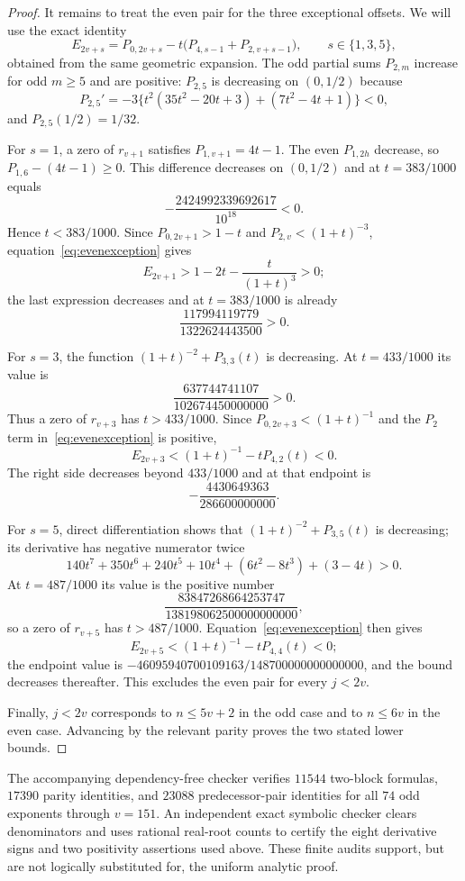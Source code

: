\documentclass[11pt]{article}
\theoremstyle{remark}
\numberwithin{equation}{section}
\begin{document}
\begin{proof}
It remains to treat the even pair for the three exceptional offsets.  We
will use the exact identity
\begin{equation}\label{eq:evenexception}
 E_{2v+s}=P_{0,2v+s}
 -t\bigl(P_{4,s-1}+P_{2,v+s-1}\bigr),
 \qquad s\in\{1,3,5\},
\end{equation}
obtained from the same geometric expansion.  The odd partial sums
$P_{2,m}$ increase for odd $m\ge5$ and are positive: $P_{2,5}$ is decreasing
on $(0,1/2)$ because
\[
 P_{2,5}'=-3\{t^2(35t^2-20t+3)+(7t^2-4t+1)\}<0,
\]
and $P_{2,5}(1/2)=1/32$.

For $s=1$, a zero of $r_{v+1}$ satisfies
$P_{1,v+1}=4t-1$.  The even $P_{1,2h}$ decrease, so
$P_{1,6}-(4t-1)\ge0$.  This difference decreases on $(0,1/2)$ and at
$t=383/1000$ equals
\[
 -\frac{2424992339692617}{10^{18}}<0.
\]
Hence $t<383/1000$.  Since $P_{0,2v+1}>1-t$ and
$P_{2,v}<(1+t)^{-3}$, equation~\eqref{eq:evenexception} gives
\[
 E_{2v+1}>1-2t-\frac{t}{(1+t)^3}>0;
\]
the last expression decreases and at $t=383/1000$ is already
\[
 \frac{117994119779}{1322624443500}>0.
\]

For $s=3$, the function $(1+t)^{-2}+P_{3,3}(t)$ is decreasing.  At
$t=433/1000$ its value is
\[
 \frac{637744741107}{102674450000000}>0.
\]
Thus a zero of $r_{v+3}$ has $t>433/1000$.  Since
$P_{0,2v+3}<(1+t)^{-1}$ and the
$P_2$ term in~\eqref{eq:evenexception} is positive,
\[
 E_{2v+3}<(1+t)^{-1}-tP_{4,2}(t)<0.
\]
The right side decreases beyond $433/1000$ and at that endpoint is
\[
 -\frac{4430649363}{286600000000}.
\]

For $s=5$, direct differentiation shows that
$(1+t)^{-2}+P_{3,5}(t)$ is decreasing; its derivative has negative
numerator twice
\[
 140t^7+350t^6+240t^5+10t^4+(6t^2-8t^3)+(3-4t)>0.
\]
At $t=487/1000$ its value is the positive number
\[
 \frac{83847268664253747}{138198062500000000000},
\]
so a zero of $r_{v+5}$ has $t>487/1000$.
Equation~\eqref{eq:evenexception} then gives
\[
 E_{2v+5}<(1+t)^{-1}-tP_{4,4}(t)<0;
\]
the endpoint value is
$-46095940700109163/148700000000000000$, and the bound decreases thereafter.
This excludes the even pair for every $j<2v$.

Finally, $j<2v$ corresponds to $n\le5v+2$ in the odd case and to
$n\le6v$ in the even case.  Advancing by the relevant parity proves the two
stated lower bounds.
\end{proof}

The accompanying dependency-free checker verifies $11544$ two-block formulas,
$17390$ parity identities, and $23088$ predecessor-pair identities for all $74$
odd exponents through $v=151$.  An independent exact symbolic checker clears
denominators and uses rational real-root counts to certify the eight derivative
signs and two positivity assertions used above.  These finite audits support,
but are not logically substituted for, the uniform analytic proof.
\end{document}
